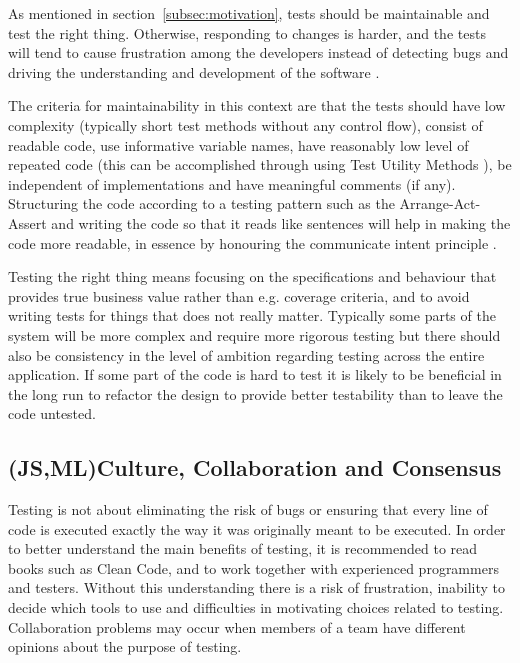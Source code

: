 \documentclass[11pt]{article}
\begin{document}
As mentioned in section~\ref{subsec:motivation}, tests should be maintainable and test the right thing. Otherwise, responding to changes is harder, and the tests will tend to cause frustration among the developers instead of detecting bugs and driving the understanding and development of the software \cite{Clean}.

The criteria for maintainability in this context are that the tests should have low complexity (typically short test methods without any control flow), consist of readable code, use informative variable names, have reasonably low level of repeated code (this can be accomplished through using Test Utility Methods \cite[599]{TestPatterns}), be independent of implementations and have meaningful comments (if any). Structuring the code according to a testing pattern such as the Arrange-Act-Assert \cite{C2} and writing the code so that it reads like sentences will help in making the code more readable, in essence by honouring the communicate intent principle \cite[p.~41]{TestPatterns}.

Testing the right thing means focusing on the specifications and behaviour that provides true business value rather than e.g. coverage criteria, and to avoid writing tests for things that does not really matter. Typically some parts of the system will be more complex and require more rigorous testing but there should also be consistency in the level of ambition regarding testing across the entire application. If some part of the code is hard to test it is likely to be beneficial in the long run to refactor the design to provide better testability than to leave the code untested. %

\subsection{(JS,ML)Culture, Collaboration and Consensus}
\label{subsec:ccc}

Testing is not about eliminating the risk of bugs or ensuring that every line of code is executed exactly the way it was originally meant to be executed. In order to better understand the main benefits of testing, it is recommended to read books such as Clean Code, and to work together with experienced programmers and testers. Without this understanding there is a risk of frustration, inability to decide which tools to use and difficulties in motivating choices related to testing. Collaboration problems may occur when members of a team have different opinions about the purpose of testing. \cite[question~38]{Edelstam}
\end{document}
